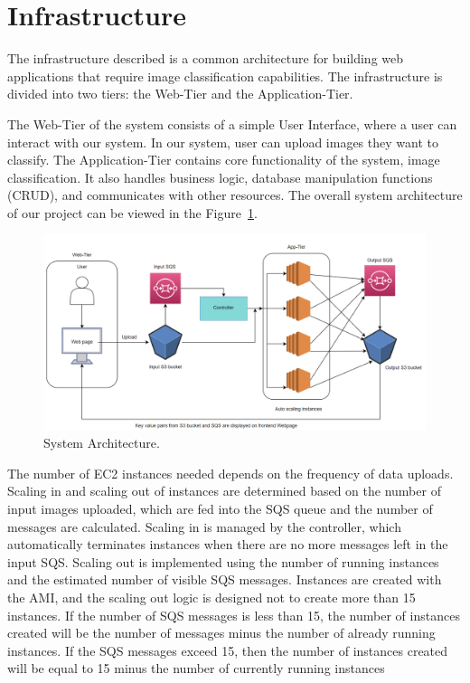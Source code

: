 \documentclass[../main.tex]{subfiles}
\begin{document}
\part*{Infrastructure}
The infrastructure described is a common architecture for building web applications that require image classification capabilities. The infrastructure is divided into two tiers: the Web-Tier and the Application-Tier.

The Web-Tier of the system consists of a simple User Interface, where a user can interact with our system. In our system, user can upload images they want to classify. The Application-Tier contains core functionality of the system, image classification. It also handles business logic, database manipulation functions (CRUD), and communicates with other resources. The overall system architecture of our project can be viewed in the Figure~\ref{fig:arc}.

\begin{figure}[h!]
\centering
\includegraphics[scale=0.68]{images/arc.png}
\caption{System Architecture.}
\label{fig:arc}
\end{figure}

The number of EC2 instances needed depends on the frequency of data uploads. Scaling in and scaling out of instances are determined based on the number of input images uploaded, which are fed into the SQS queue and the number of messages are calculated. Scaling in is managed by the controller, which automatically terminates instances when there are no more messages left in the input SQS. Scaling out is implemented using the number of running instances and the estimated number of visible SQS messages. Instances are created with the AMI, and the scaling out logic is designed not to create more than 15 instances. If the number of SQS messages is less than 15, the number of instances created will be the number of messages minus the number of already running instances. If the SQS messages exceed 15, then the number of instances created will be equal to 15 minus the number of currently running instances
\end{document}
